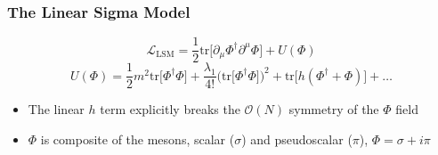 \documentclass[10pt,a4paper,usenames,dvipsnames]{beamer}
\begin{document}
\footnotesize

\begin{frame}
  \frametitle{The Linear Sigma Model}
  \begin{block}{}
    \begin{equation*}
      \mathcal{L}_{\text{LSM}} = \frac{1}{2}\text{tr}\big[\partial_{\mu}\Phi^{\dagger}\partial^{\mu}\Phi\big] + U(\Phi)
    \end{equation*}
    \begin{equation*}
      U(\Phi) = \frac{1}{2}m^2\text{tr}\big[\Phi^{\dagger}\Phi\big] + \frac{\lambda_1}{4!}\Big(\text{tr}\big[\Phi^{\dagger}\Phi\big]\Big)^2 + 
      \text{tr}\big[h(\Phi^{\dagger} + \Phi)\big]  + \dots
    \end{equation*}
  \end{block}

  \begin{itemize}
    \item The linear $h$ term explicitly breaks the $\mathcal{O}(N)$ symmetry of the $\Phi$ field
    \item $\Phi$ is composite of the mesons, scalar ($\sigma$) and pseudoscalar ($\pi$), $\Phi = \sigma + i\pi$
  \end{itemize}

\end{frame}
\end{document}
